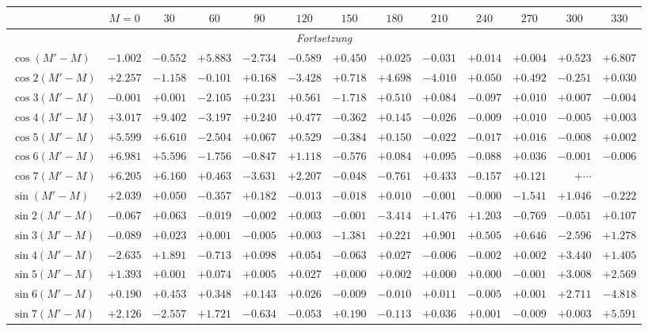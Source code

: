 \documentclass[12pt,a4paper]{article}
\begin{document}
\small
\begin{longtable}{@{}l|rrrrrrrrrrrr@{}}
\multicolumn{1}{c|}{} & \multicolumn{1}{c}{$M=0$} & \multicolumn{1}{c}{$30$} & \multicolumn{1}{c}{$60$} & \multicolumn{1}{c}{$90$} & \multicolumn{1}{c}{$120$} & \multicolumn{1}{c}{$150$} & \multicolumn{1}{c}{$180$} & \multicolumn{1}{c}{$210$} & \multicolumn{1}{c}{$240$} & \multicolumn{1}{c}{$270$} & \multicolumn{1}{c}{$300$} & \multicolumn{1}{c}{$330$}\\
\midrule
\endfirsthead
\multicolumn{13}{c}{\textit{Fortsetzung}}\\
\midrule
\endhead
$\cos(M'-M)$ & $-1.002$ & $-0.552$ & $+5.883$ & $-2.734$ & $-0.589$ & $+0.450$ & $+0.025$ & $-0.031$ & $+0.014$ & $+0.004$ & $+0.523$ & $+6.807$\\
$\cos 2(M'-M)$ & $+2.257$ & $-1.158$ & $-0.101$ & $+0.168$ & $-3.428$ & $+0.718$ & $+4.698$ & $-4.010$ & $+0.050$ & $+0.492$ & $-0.251$ & $+0.030$\\
$\cos 3(M'-M)$ & $-0.001$ & $+0.001$ & $-2.105$ & $+0.231$ & $+0.561$ & $-1.718$ & $+0.510$ & $+0.084$ & $-0.097$ & $+0.010$ & $+0.007$ & $-0.004$\\
$\cos 4(M'-M)$ & $+3.017$ & $+9.402$ & $-3.197$ & $+0.240$ & $+0.477$ & $-0.362$ & $+0.145$ & $-0.026$ & $-0.009$ & $+0.010$ & $-0.005$ & $+0.003$\\
$\cos 5(M'-M)$ & $+5.599$ & $+6.610$ & $-2.504$ & $+0.067$ & $+0.529$ & $-0.384$ & $+0.150$ & $-0.022$ & $-0.017$ & $+0.016$ & $-0.008$ & $+0.002$\\
$\cos 6(M'-M)$ & $+6.981$ & $+5.596$ & $-1.756$ & $-0.847$ & $+1.118$ & $-0.576$ & $+0.084$ & $+0.095$ & $-0.088$ & $+0.036$ & $-0.001$ & $-0.006$\\
$\cos 7(M'-M)$ & $+6.205$ & $+6.160$ & $+0.463$ & $-3.631$ & $+2.207$ & $-0.048$ & $-0.761$ & $+0.433$ & $-0.157$ & $+0.121$ & $+\cdots$ & \\
\midrule
$\sin(M'-M)$ & $+2.039$ & $+0.050$ & $-0.357$ & $+0.182$ & $-0.013$ & $-0.018$ & $+0.010$ & $-0.001$ & $-0.000$ & $-1.541$ & $+1.046$ & $-0.222$\\
$\sin 2(M'-M)$ & $-0.067$ & $+0.063$ & $-0.019$ & $-0.002$ & $+0.003$ & $-0.001$ & $-3.414$ & $+1.476$ & $+1.203$ & $-0.769$ & $-0.051$ & $+0.107$\\
$\sin 3(M'-M)$ & $-0.089$ & $+0.023$ & $+0.001$ & $-0.005$ & $+0.003$ & $-1.381$ & $+0.221$ & $+0.901$ & $+0.505$ & $+0.646$ & $-2.596$ & $+1.278$\\
$\sin 4(M'-M)$ & $-2.635$ & $+1.891$ & $-0.713$ & $+0.098$ & $+0.054$ & $-0.063$ & $+0.027$ & $-0.006$ & $-0.002$ & $+0.002$ & $+3.440$ & $+1.405$\\
$\sin 5(M'-M)$ & $+1.393$ & $+0.001$ & $+0.074$ & $+0.005$ & $+0.027$ & $+0.000$ & $+0.002$ & $+0.000$ & $+0.000$ & $-0.001$ & $+3.008$ & $+2.569$\\
$\sin 6(M'-M)$ & $+0.190$ & $+0.453$ & $+0.348$ & $+0.143$ & $+0.026$ & $-0.009$ & $-0.010$ & $+0.011$ & $-0.005$ & $+0.001$ & $+2.711$ & $-4.818$\\
$\sin 7(M'-M)$ & $+2.126$ & $-2.557$ & $+1.721$ & $-0.634$ & $-0.053$ & $+0.190$ & $-0.113$ & $+0.036$ & $+0.001$ & $-0.009$ & $+0.003$ & $+5.591$\\
\bottomrule
\end{longtable}
\end{document}
